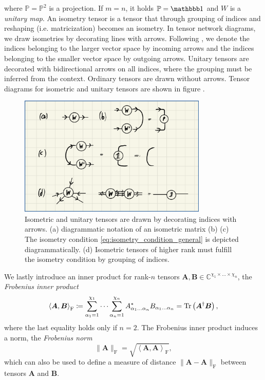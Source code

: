 where $\mathbb{P} = \mathbb{P}^2$ is a projection. If $m = n$, it holds $\mathbb{P} = \id$ and $W$ is a \textit{unitary map}. An isometry tensor is a tensor that through grouping of indices and reshaping (i.e. matricization) becomes an isometry. In tensor network diagrams, we draw isometries by decorating lines with arrows. Following \cite{cite:isometric_tensor_network_states_in_two_dimensions, cite:efficient_simulation_of_dynamics_in_two_dimensional_quantum_spin_systems}, we denote the indices belonging to the larger vector space by incoming arrows and the indices belonging to the smaller vector space by outgoing arrows. Unitary tensors are decorated with bidirectional arrows on all indices, where the grouping must be inferred from the context. Ordinary tensors are drawn without arrows. Tensor diagrams for isometric and unitary tensors are shown in figure .\par
\begin{figure}
	\centering
	\includegraphics[width=0.8\textwidth]{figures/Tensor_Networks/basic_isometric_tensor_diagrams.jpeg}
	\caption{Isometric and unitary tensors are drawn by decorating indices with arrows. (a) diagrammatic notation of an isometric matrix (b) (c) The isometry condition \eqref{eq:isometry_condition_general} is depicted diagrammatically. (d) Isometric tensors of higher rank must fulfill the isometry condition by grouping of indices.}
	\label{fig:isometries_and_unitaries_diagrams}
\end{figure}
We lastly introduce an inner product for rank-$n$ tensors $\bm{A}, \bm{B} \in \mathbb{C}^{\chi_1\times\dots\times\chi_n}$, the \textit{Frobenius inner product}
\begin{equation}
	\label{eq:frobenius_inner_product}
	\left\langle \bm{A}, \bm{B}\right\rangle_\text{F} \coloneqq \sum_{\alpha_1=1}^{\chi_1} \dots \sum_{\alpha_n=1}^{\chi_n} A_{\alpha_1\dots\alpha_n}^*B_{\alpha_1\dots\alpha_n} = \operatorname{Tr}\left(\bm{A}^\dagger\bm{B}\right),
\end{equation}
where the last equality holds only if $n = 2$. The Frobenius inner product induces a norm, the \textit{Frobenius norm}
\begin{equation}
	\label{eq:frobenius_norm}
	\lVert\bm{A}\rVert_\text{F} = \sqrt{\left\langle\bm{A}, \bm{A}\right\rangle_\text{F}},
\end{equation}
which can also be used to define a measure of distance $\lVert\bm{A}-\bm{A}\rVert_\text{F}$ between tensors $\bm{A}$ and $\bm{B}$.